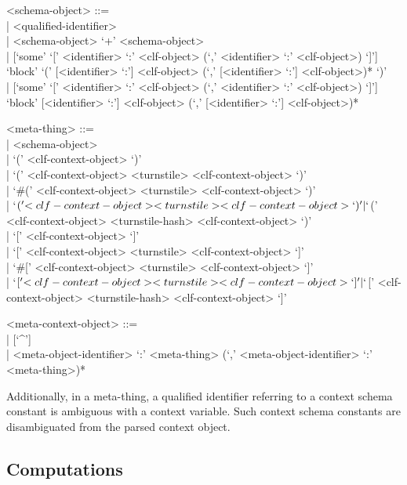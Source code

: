 \documentclass[11pt]{article}
\begin{document}
\begin{grammar}
<schema-object> ::= \hfill\\
| <qualified-identifier>\\
| <schema-object> `+' <schema-object>\\
| [`some' `[' <identifier> `:' <clf-object> (`,' <identifier> `:' <clf-object>) `]']\\
`block' `(' [<identifier> `:'] <clf-object> (`,' [<identifier> `:'] <clf-object>)* `)'\\
| [`some' `[' <identifier> `:' <clf-object> (`,' <identifier> `:' <clf-object>) `]']\\
`block' [<identifier> `:'] <clf-object> (`,' [<identifier> `:'] <clf-object>)*

<meta-thing> ::= \hfill\\
| <schema-object>\\
| `(' <clf-context-object> `)'\\
| `(' <clf-context-object> <turnstile> <clf-context-object> `)'\\
| `#(' <clf-context-object> <turnstile> <clf-context-object> `)'\\
| `$(' <clf-context-object> <turnstile> <clf-context-object> `)'\\
| `$(' <clf-context-object> <turnstile-hash> <clf-context-object> `)'\\
| `[' <clf-context-object> `]'\\
| `[' <clf-context-object> <turnstile> <clf-context-object> `]'\\
| `#[' <clf-context-object> <turnstile> <clf-context-object> `]'\\
| `$[' <clf-context-object> <turnstile> <clf-context-object> `]'\\
| `$[' <clf-context-object> <turnstile-hash> <clf-context-object> `]'

<meta-context-object> ::= \hfill\\
| [`^']\\
| <meta-object-identifier> `:' <meta-thing> (`,' <meta-object-identifier> `:' <meta-thing>)*
\end{grammar}

Additionally, in a meta-thing, a qualified identifier referring to a context schema constant is ambiguous with a context variable.
Such context schema constants are disambiguated from the parsed context object.

\subsection{Computations}
\end{document}
